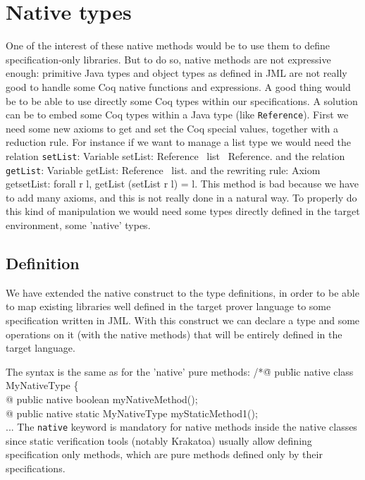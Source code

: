 \section{Native types}
One of the interest of these native methods would be to use them to define  specification-only libraries.
But to do so, native methods are not expressive enough: primitive Java types and
object types as defined in JML are not really good to handle some Coq native functions and expressions.
A good thing would be to be able to use directly some Coq types within our specifications.
A solution can be to embed some Coq types within a Java type (like {\tt Reference}).
First we need some new axioms to get and set the Coq special values, together with a reduction rule. 
For instance if we want to manage a list type
we would need the relation {\tt setList}:
\btab
Variable setList: Reference \rarrow \ list \rarrow \ Reference.
\etab
and the relation {\tt getList}:
\btab
Variable getList:  Reference \rarrow \ list.
\etab
and the rewriting rule:
\btab
Axiom getsetList: forall r l, getList (setList r l) = l.
\etab 
This method is bad because we have to add many axioms, and this is not really 
done in a natural way.
To properly do this kind of manipulation we would need some types directly defined 
in the target environment,  some 'native' types.

\subsection{Definition}
We have extended the native construct to the type definitions, in order to be able to map
existing libraries well defined in the target prover language to some specification written in
JML. With this construct we can declare a type and some operations on it (with the native methods)
that will be entirely defined in the target language.

The syntax is the same as for the 'native' pure methods:
\btab
/*\=@ pub\=lic native class MyNativeType \{\+\\
   @ \> public native boolean myNativeMethod();\\
   @ \> public native static MyNativeType myStaticMethod1();\\
   ...
\etab
The {\tt native} keyword is mandatory for native methods inside the native classes 
since static verification tools (notably Krakatoa) usually allow defining specification only 
methods, which are pure methods defined only by their specifications.


